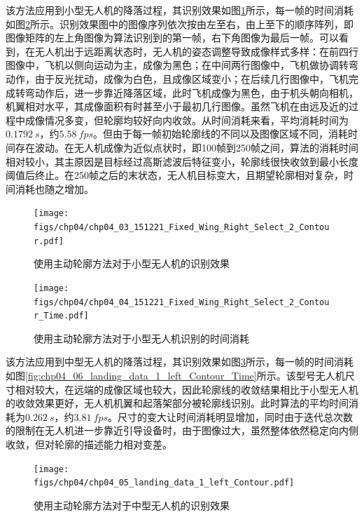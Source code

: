 该方法应用到小型无人机的降落过程，其识别效果如图\ref{fig:chp04_03_151221_Fixed_Wing_Right_Select_2_Contour}所示，每一帧的时间消耗如图\ref{fig:chp04_04_151221_Fixed_Wing_Right_Select_2_Contour_Time}所示。识别效果图中的图像序列依次按由左至右，由上至下的顺序阵列，即图像矩阵的左上角图像为算法识别到的第一帧，右下角图像为最后一帧。可以看到，在无人机出于远距离状态时，无人机的姿态调整导致成像样式多样：在前四行图像中，飞机以侧向运动为主，成像为黑色；在中间两行图像中，飞机做协调转弯动作，由于反光扰动，成像为白色，且成像区域变小；在后续几行图像中，飞机完成转弯动作后，进一步靠近降落区域，此时飞机成像为黑色，由于机头朝向相机，机翼相对水平，其成像面积有时甚至小于最初几行图像。虽然飞机在由远及近的过程中成像情况多变，但轮廓均较好向内收敛。从时间消耗来看，平均消耗时间为$0.1792\ s$，约$5.58\ fps$。但由于每一帧初始轮廓线的不同以及图像区域不同，消耗时间存在波动。在无人机成像为近似点状时，即100帧到250帧之间，算法的消耗时间相对较小，其主原因是目标经过高斯滤波后特征变小，轮廓线很快收敛到最小长度阈值后终止。在250帧之后的末状态，无人机目标变大，且期望轮廓相对复杂，时间消耗也随之增加。

\begin{figure}[ht]   
	\centering
	\texttt{[image: figs/chp04/chp04\_03\_151221\_Fixed\_Wing\_Right\_Select\_2\_Contour.pdf]}
	\caption{使用主动轮廓方法对于小型无人机的识别效果}
	\label{fig:chp04_03_151221_Fixed_Wing_Right_Select_2_Contour}
\end{figure}

\begin{figure}[ht]   
	\centering
	\texttt{[image: figs/chp04/chp04\_04\_151221\_Fixed\_Wing\_Right\_Select\_2\_Contour\_Time.pdf]}
	\caption{使用主动轮廓方法对于小型无人机识别的时间消耗}
	\label{fig:chp04_04_151221_Fixed_Wing_Right_Select_2_Contour_Time}
\end{figure}

该方法应用到中型无人机的降落过程，其识别效果如图\ref{fig:chp04_05_landing_data_1_left_Contour}所示，每一帧的时间消耗如图\ref{fig:chp04_06_landing_data_1_left_Contour_Time}所示。该型号无人机尺寸相对较大，在远端的成像区域也较大，因此轮廓线的收敛结果相比于小型无人机的收敛效果更好，无人机机翼和起落架部分被轮廓线识别。此时算法的平均时间消耗为$0.262\ s$，约$3.81\ fps$。尺寸的变大让时间消耗明显增加，同时由于迭代总次数的限制在无人机进一步靠近引导设备时，由于图像过大，虽然整体依然稳定向内侧收敛，但对轮廓的描述能力相对变差。
\begin{figure}[ht]   
	\centering
	\texttt{[image: figs/chp04/chp04\_05\_landing\_data\_1\_left\_Contour.pdf]}
	\caption{使用主动轮廓方法对于中型无人机的识别效果}
	\label{fig:chp04_05_landing_data_1_left_Contour}
\end{figure}

